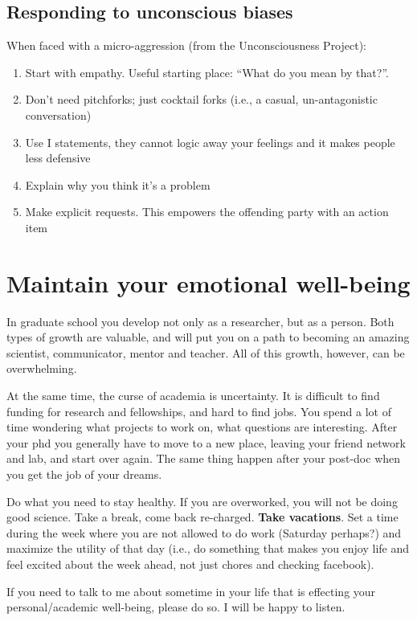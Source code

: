 \documentclass[12pt]{article}
\begin{document}
\subsection{Responding to unconscious biases}
\label{sec:responding}
When faced with a micro-aggression (from the Unconsciousness Project):
\begin{enumerate}
\item Start with empathy. Useful starting place: ``What do you mean by
  that?''. 
\item Don't need pitchforks; just cocktail forks (i.e., a
  casual, un-antagonistic conversation)
\item Use I statements, they cannot logic away your feelings and it
  makes people less defensive
\item Explain why you think it's a problem
\item Make explicit requests. This empowers the offending party with
  an action item
\end{enumerate}


\section{Maintain your emotional well-being}
\label{sec:wellBeing}

In graduate school you develop not only as a researcher, but as a
person. Both types of growth are valuable, and will put you on a path
to becoming an amazing scientist, communicator, mentor and
teacher. All of this growth, however, can be overwhelming.

At the same time, the curse of academia is uncertainty. It is
difficult to find funding for research and fellowships, and hard to
find jobs. You spend a lot of time wondering what projects to work on,
what questions are interesting. After your phd you generally have to
move to a new place, leaving your friend network and lab, and start
over again. The same thing happen after your post-doc when you get the
job of your dreams.

Do what you need to stay healthy. If you are overworked, you will not
be doing good science. Take a break, come back re-charged. \textbf{Take
vacations}. Set a time during the week where you are not allowed to do
work (Saturday perhaps?) and maximize the utility of that day (i.e.,
do something that makes you enjoy life and feel excited about the week
ahead, not just chores and checking facebook).

If you need to talk to me about sometime in your life that is effecting
your personal/academic well-being, please do so. I will be happy to
listen. 
\end{document}
